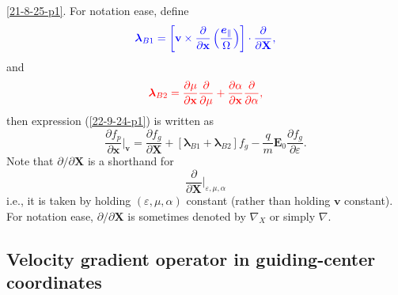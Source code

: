 \documentclass{llncs}
\newcommand{\nobracket}{}
\newcommand{\tmcolor}[2]{{\color{#1}{#2}}}
\newcommand{\tmmathbf}[1]{\ensuremath{\boldsymbol{#1}}}
\begin{document}
\ref{21-8-25-p1}. For notation ease, define
\begin{equation}
  \label{18-9-16-1} \tmcolor{blue}{\tmmathbf{\lambda}_{B 1} = \left[
  \mathbf{v} \times \frac{\partial}{\partial \mathbf{x}} \left(
  \frac{\tmmathbf{e}_{\parallel}}{\Omega} \right) \right] \cdot
  \frac{\partial}{\partial \mathbf{X}},}
\end{equation}
and
\begin{equation}
  \label{18-9-16-2} \tmcolor{red}{\tmmathbf{\lambda}_{B 2} = \frac{\partial
  \mu}{\partial \mathbf{x}}  \frac{\partial}{\partial \mu} + \frac{\partial
  \alpha}{\partial \mathbf{x}}  \frac{\partial}{\partial \alpha},}
\end{equation}
then expression (\ref{22-9-24-p1}) is written as
\begin{equation}
  \label{17-9-2-p1} \frac{\partial f_p}{\partial \mathbf{x}} |_{\mathbf{v}}
  \nobracket = \frac{\partial f_g}{\partial \mathbf{X}} +
  [\tmmathbf{\lambda}_{B 1} +\tmmathbf{\lambda}_{B 2}] f_g - \frac{q}{m}
  \mathbf{E}_0 \frac{\partial f_g}{\partial \varepsilon} .
\end{equation}
Note that $\partial / \partial \mathbf{X}$ is a shorthand for
\[ \frac{\partial}{\partial \mathbf{X}} |_{\varepsilon, \mu, \alpha}
   \nobracket \]
i.e., it is taken by holding $(\varepsilon, \mu, \alpha)$ constant (rather
than holding $\mathbf{v}$ constant). For notation ease, $\partial / \partial
\mathbf{X}$ is sometimes denoted by $\nabla_X$ or simply $\nabla$.

\subsection{Velocity gradient operator in guiding-center coordinates}
\end{document}
